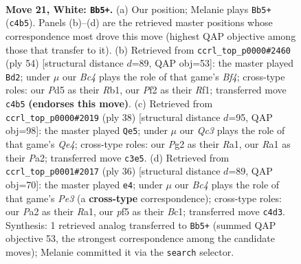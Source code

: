 \documentclass[11pt]{article}
\begin{document}
\clearpage

\begin{figure}[p]\centering
\begin{subfigure}{0.46\textwidth}\centering
\resizebox{\linewidth}{!}{%
\newchessgame
\chessboard[
  setfen={rnb1k2r/2q5/3p4/p2Pppb1/2B3p1/2Q5/PPP2PP1/R1B1RK2 w kq - 0 21},
  showmover=false,
  pgfstyle=straightmove, color=movearrow, markmove={c4-b5}
]}
\caption{}
\end{subfigure}\hfill
\begin{subfigure}{0.46\textwidth}\centering
\resizebox{\linewidth}{!}{%
\newchessgame
\chessboard[
  setfen={r1b2rk1/4q1p1/2p1p2p/p1bpP3/5B2/3B3Q/P1P3PP/1R3R1K w - - 2 28},
  showmover=false,
  pgfstyle=straightmove, color=movearrow, markmove={f4-d2}
]}
\caption{}
\end{subfigure}
\\[4pt]
\begin{subfigure}{0.46\textwidth}\centering
\resizebox{\linewidth}{!}{%
\newchessgame
\chessboard[
  setfen={r3k2r/1p2bpp1/2p3p1/p5qn/3PQ3/4P2P/PP3PB1/R1B2RK1 w kq - 2 20},
  showmover=false,
  pgfstyle=straightmove, color=movearrow, markmove={e4-e5}
]}
\caption{}
\end{subfigure}\hfill
\begin{subfigure}{0.46\textwidth}\centering
\resizebox{\linewidth}{!}{%
\newchessgame
\chessboard[
  setfen={r3k2r/1p3pp1/2p3p1/p5qn/1b1P4/4P2P/PPQ2PB1/R1B2RK1 w kq - 0 19},
  showmover=false,
  pgfstyle=straightmove, color=movearrow, markmove={e3-e4}
]}
\caption{}
\end{subfigure}
\caption{\textbf{Move 21, White: \texttt{Bb5+}.} (a) Our position; Melanie plays \texttt{Bb5+} (\texttt{c4b5}). Panels (b)--(d) are the retrieved master positions whose correspondence most drove this move (highest QAP objective among those that transfer to it). (b) Retrieved from \texttt{ccrl\_top\_p0000\#2460} (ply 54) [structural distance $d$=89, QAP obj=53]: the master played \texttt{Bd2}; under $\mu$ our \emph{Bc4} plays the role of that game's \emph{Bf4}; cross-type roles: our \emph{P}d5 as their \emph{R}b1, our \emph{P}f2 as their \emph{R}f1; transferred move \texttt{c4b5} \textbf{(endorses this move)}. (c) Retrieved from \texttt{ccrl\_top\_p0000\#2019} (ply 38) [structural distance $d$=95, QAP obj=98]: the master played \texttt{Qe5}; under $\mu$ our \emph{Qc3} plays the role of that game's \emph{Qe4}; cross-type roles: our \emph{P}g2 as their \emph{R}a1, our \emph{R}a1 as their \emph{P}a2; transferred move \texttt{c3e5}. (d) Retrieved from \texttt{ccrl\_top\_p0001\#2017} (ply 36) [structural distance $d$=89, QAP obj=70]: the master played \texttt{e4}; under $\mu$ our \emph{Bc4} plays the role of that game's \emph{Pe3} (a \textbf{cross-type} correspondence); cross-type roles: our \emph{P}a2 as their \emph{R}a1, our \emph{p}f5 as their \emph{B}c1; transferred move \texttt{c4d3}. Synthesis: 1 retrieved analog transferred to \texttt{Bb5+} (summed QAP objective 53, the strongest correspondence among the candidate moves); Melanie committed it via the \texttt{search} selector.}
\label{fig:thought-m40}
\end{figure}
\end{document}
